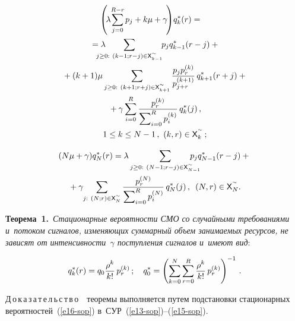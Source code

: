 \begin{multicols}{2}
  \vspace*{-12pt}
  
  \noindent
  \begin{multline}
\!\!\!\! \! \left( \!\lambda\!\sum\limits_{j=0}^{R-r}\hspace*{-0.5pt} 
p_j+k\mu+\gamma\!\right) \!
q_k^*(r)={}\\
{}=\lambda \hspace*{-13pt}\sum\limits_{j\geq 0:\ (k-1;r-j)\in 
{\sf X}^{\sptilde}_{k-1}}
\hspace*{-3pt} p_j 
q^*_{k-1}(r-j)+{}\\
  {}+ (k+1)\mu \sum\limits_{j\geq0:\ (k+1;r+j)\in {\sf X}^{\sptilde}_{k+1}} \fr{p_j 
p_r^{(k)}}{p_{j+r}^{(k+1)}}\, q^*_{k+1}(r+j)+{}\\
  {}+\gamma \sum\limits^R_{i=0} \fr{p_r^{(k)}} {\sum\nolimits^R_{i=0} 
p_i^{(k)}}\,q_k^*(j)\,,\\
  1\leq k\leq N-1\,,\ (k,r)\in {\sf X}_k^{\sptilde}\,;
  \label{e14-sop}
  \end{multline}
  
  \vspace*{-12pt}
  
  \noindent
  \begin{multline}
  (N\mu+\gamma) q_N^*(r) =\lambda \sum\limits_{j\geq0:\ (N-1; r-j)\in {\sf 
X}_{N-1}^{\sptilde}} \hspace*{-5mm}p_j q^*_{N-1}(r-j)+{}\\
\!\!\!  {}+ \gamma\hspace*{-2pt}\sum\limits_{j:\ (N;r)\in{\sf X}^{\sptilde}_N} \fr{p_r^{(N)}} 
{\sum\nolimits^R_{i=0} p_i^{(N)}}\,q_N^*(j)\,,\enskip
(N,r)\in {\sf X}^{\sptilde}_N.\!\!\!
  \label{e15-sop}
  \end{multline}
  

\noindent
\textbf{Теорема~1.}\ \textit{Стационарные вероятности СМО со случайными 
требованиями и~потоком сигналов, изменяющих суммарный объем 
занимаемых ресурсов, не зависят от интенсивности~$\gamma$ поступления 
сигналов и~имеют вид}:

\noindent
\begin{equation}
q_k^*(r) = q_0\displaystyle\frac{\displaystyle \rho^k\mathstrut}{\displaystyle k!\mathstrut}\,p_r^{(k)}\,;\quad
q_0^* = \left( \sum\limits_{k=0}^N \sum\limits_{r=0}^R 
\displaystyle\frac{\displaystyle \rho^k\mathstrut}{\displaystyle k!\mathstrut}\,p_r^{(k)}\right) ^{-1}\,.
\label{e16-sop}
\end{equation}
  
  \noindent
  Д\,о\,к\,а\,з\,а\,т\,е\,л\,ь\,с\,т\,в\,о\ \ теоремы выполняется путем подстановки 
стационарных вероятностей~(\ref{e16-sop}) в~СУР~(\ref{e13-sop})--(\ref{e15-sop}).


\end{multicols}
